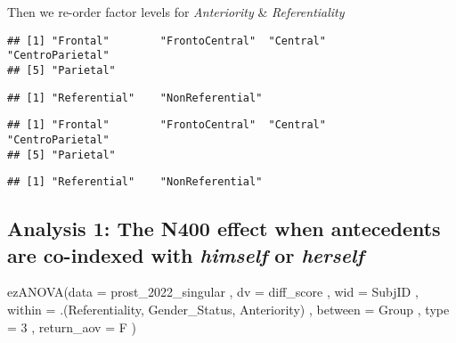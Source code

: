 \documentclass[
]{article}
\newenvironment{Shaded}{\begin{snugshade}}{\end{snugshade}}
\newcommand{\AttributeTok}[1]{\textcolor[rgb]{0.77,0.63,0.00}{#1}}
\newcommand{\DecValTok}[1]{\textcolor[rgb]{0.00,0.00,0.81}{#1}}
\newcommand{\FunctionTok}[1]{\textcolor[rgb]{0.00,0.00,0.00}{#1}}
\newcommand{\NormalTok}[1]{#1}
\begin{document}
Then we re-order factor levels for \emph{Anteriority} \&
\emph{Referentiality}

\begin{verbatim}
## [1] "Frontal"        "FrontoCentral"  "Central"        "CentroParietal"
## [5] "Parietal"
\end{verbatim}

\begin{verbatim}
## [1] "Referential"    "NonReferential"
\end{verbatim}

\begin{verbatim}
## [1] "Frontal"        "FrontoCentral"  "Central"        "CentroParietal"
## [5] "Parietal"
\end{verbatim}

\begin{verbatim}
## [1] "Referential"    "NonReferential"
\end{verbatim}

\hypertarget{analysis-1-the-n400-effect-when-antecedents-are-co-indexed-with-himself-or-herself}{%
\subsection{\texorpdfstring{Analysis 1: The N400 effect when antecedents
are co-indexed with \emph{himself} or
\emph{herself}}{Analysis 1: The N400 effect when antecedents are co-indexed with himself or herself}}\label{analysis-1-the-n400-effect-when-antecedents-are-co-indexed-with-himself-or-herself}}

\begin{Shaded}
\begin{Highlighting}[]
\FunctionTok{ezANOVA}\NormalTok{(}\AttributeTok{data =}\NormalTok{ prost\_2022\_singular}
\NormalTok{              , }\AttributeTok{dv =}\NormalTok{ diff\_score}
\NormalTok{              , }\AttributeTok{wid =}\NormalTok{ SubjID}
\NormalTok{              , }\AttributeTok{within =}\NormalTok{ .(Referentiality, Gender\_Status, Anteriority)}
\NormalTok{              , }\AttributeTok{between =}\NormalTok{ Group}
\NormalTok{              , }\AttributeTok{type =} \DecValTok{3}
\NormalTok{              , }\AttributeTok{return\_aov =}\NormalTok{ F}
\NormalTok{              )}
\end{Highlighting}
\end{Shaded}
\end{document}
